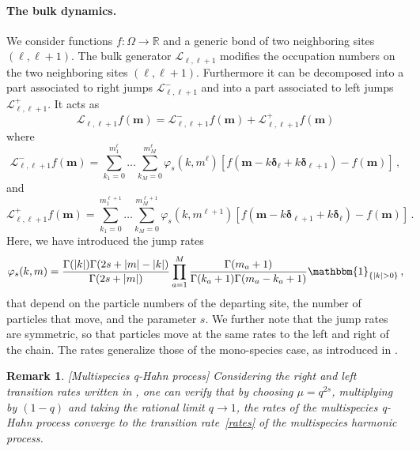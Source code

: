 \documentclass[11pt]{article}
\numberwithin{equation}{section}
\newtheorem{remark}[theorem]{Remark}
\newcommand{\M}{M}
\newcommand{\eL}{\mathcal{L}}
\begin{document}
	\paragraph{The bulk dynamics.} We consider functions $f:\Omega\to \mathbb{R}$ and a generic bond of two neighboring sites $(\ell ,\ell +1)$. The bulk generator $\mathcal{L}_{\ell ,\ell +1}$ modifies the occupation numbers on the two neighboring sites $(\ell ,\ell +1)$. Furthermore it can be decomposed into a part  associated to right jumps $\mathcal{L}^{-}_{\ell ,\ell +1}$ and into a part associated to left jumps $\mathcal{L}^{+}_{\ell ,\ell +1}$. It acts as
	\begin{equation}\label{bulk-generatorDensity}
		\eL_{\ell ,\ell +1}f(\bm{m})=\eL^{-}_{\ell ,\ell +1}f(\bm{m})+\eL^{+}_{\ell ,\ell +1}f(\bm{m})
	\end{equation}
	where
	\begin{equation}
		\eL^{-}_{\ell ,\ell +1}f(\bm{m})=\sum_{k_{1}=0}^{m_{1}^{\ell }}\ldots\sum_{k_{\M}=0}^{m_{\M}^{\ell }}\varphi_{s}(k,m^{\ell })\left[f(\bm{m}-k\bm{\delta}_{\ell }+k\bm{\delta}_{\ell +1})-f(\bm{m})\right]\,,
	\end{equation}
	and   
		\begin{equation}
		\eL^{+}_{\ell ,\ell +1}f(\bm{m})=\sum_{k_{1}=0}^{m_{1}^{\ell +1}}\ldots\sum_{k_{\M}=0}^{m_{\M}^{\ell +1}}\varphi_{s}(k,m^{\ell +1})\left[f(\bm{m}-k\bm{\delta}_{\ell +1}+k\bm{\delta}_{\ell })-f(\bm{m})\right]\,.
	\end{equation}
	Here, we have introduced the jump rates
\begin{align}\label{rates}
	\varphi_{s}({k},{m})=\frac{\Gamma(|k|)\Gamma(2s+|m|-|k|)}{\Gamma(2s+|m|)}\prod_{a=1}^{\M}\frac{\Gamma(m_{a}+1)}{\Gamma(k_{a}+1)\Gamma(m_{a}-k_{a}+1)}\mathbbm{1}_{\{|k|>0\}}\,,
\end{align}
that depend on the particle numbers of the departing site, the number of particles that move, and the parameter $s$. We further note that the jump rates are symmetric, so that particles move at the same rates to the left and right of the chain. The rates generalize those of the mono-species case, as introduced in \cite{Frassek:2019vjt}.

\begin{remark}\label{Remark-MqHahn}[Multispecies q-Hahn process]
    Considering the right and left transition rates written in \cite[Eq. (51),(59)]{Kuniba:2016fpi}, one can verify that by choosing $\mu=q^{2s}$, multiplying by $(1-q)$ and taking the rational limit $q\to 1$, the rates of the multispecies q-Hahn process  converge to the transition rate~\eqref{rates} of the multispecies harmonic process.
\end{remark}
\end{document}

